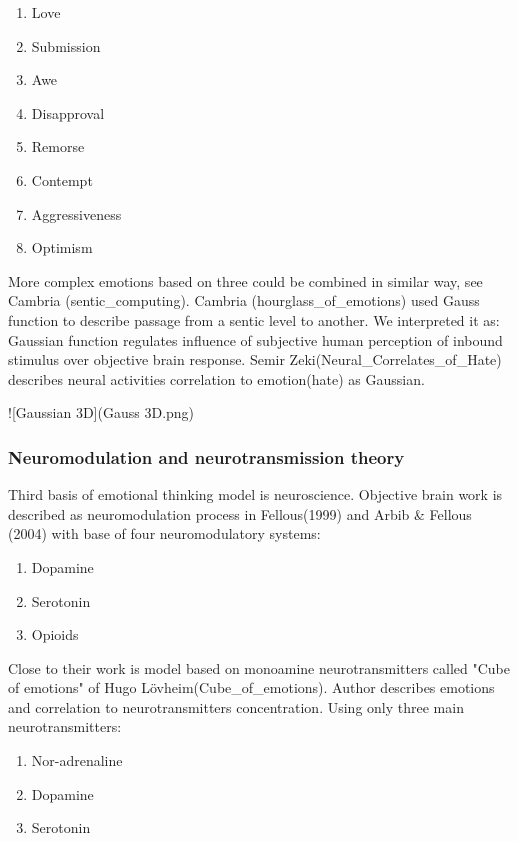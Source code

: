 \begin{enumerate}
\item  Love
\item  Submission
\item  Awe
\item  Disapproval
\item  Remorse
\item  Contempt
\item  Aggressiveness
\item  Optimism
\end{enumerate}

More complex emotions based on three could be combined in similar way, see Cambria (sentic_computing).
Cambria (hourglass_of_emotions) used Gauss function to describe passage from a sentic level to another. We interpreted it as: Gaussian function regulates influence of subjective human perception of inbound stimulus over objective brain response. Semir Zeki(Neural_Correlates_of_Hate) describes neural activities correlation to emotion(hate) as Gaussian.

![Gaussian 3D](Gauss 3D.png)


\subsubsection{Neuromodulation and neurotransmission theory}

Third basis of emotional thinking model is neuroscience. Objective brain work is described as neuromodulation process in Fellous(1999) and Arbib & Fellous (2004) with base of four neuromodulatory systems:

\begin{enumerate}
\item  Dopamine
\item  Serotonin
\item  Opioids
\end{enumerate}

Close to their work is model based on monoamine neurotransmitters called "Cube of emotions" of Hugo Lövheim(Cube_of_emotions).
Author describes emotions and correlation to neurotransmitters concentration. Using only three main neurotransmitters:

\begin{enumerate}
\item  Nor-adrenaline
\item  Dopamine
\item  Serotonin
\end{enumerate}

